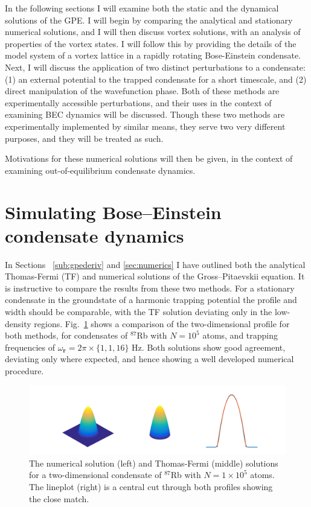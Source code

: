 In the following sections I will examine both the static and the dynamical solutions of the GPE. I will begin by comparing the analytical and stationary numerical solutions, and I will then discuss vortex solutions, with an analysis of properties of the vortex states. I will follow this by providing the details of the model system of a vortex lattice in a rapidly rotating Bose-Einstein condensate. Next, I will discuss the application of two distinct perturbations to a condensate: (1) an external potential to the trapped condensate for a short timescale, and (2) direct manipulation of the wavefunction phase. Both of these methods are experimentally accessible perturbations, and their uses in the context of examining BEC dynamics will be discussed. Though these two methods are experimentally implemented by similar means, they serve two very different purposes, and they will be treated as such.

Motivations for these numerical solutions will then be given, in the context of examining out-of-equilibrium condensate dynamics.


\section{Simulating Bose--Einstein condensate dynamics}

In Sections ~\ref{sub:gpederiv} and \ref{sec:numerics} I have outlined both the analytical Thomas-Fermi (TF) and numerical solutions of the Gross--Pitaevskii equation. It is instructive to compare the results from these two methods. For a stationary condensate in the groundstate of a harmonic trapping potential the profile and width should be comparable, with the TF solution deviating only in the low-density regions. Fig.~\ref{fig:gpe_tf_3} shows a comparison of the two-dimensional profile for both methods, for condensates of $^{87}$Rb with $N=10^{5}$ atoms, and trapping frequencies of $\omega_{\mathbf{r}}=2\pi\times\{1,1,16 \}$ Hz. Both solutions show good agreement, deviating only where expected, and hence showing a well developed numerical procedure.
\begin{figure}\centering
    \includegraphics[width=\textwidth,trim=0ex 0ex 0ex 0ex]{Images/ch4_vtx/gpe_tf_3.pdf}
    \caption{The numerical solution (left) and Thomas-Fermi (middle) solutions for a two-dimensional condensate of $^{87}$Rb with $N=1\times 10^5$ atoms. The lineplot (right) is a central cut through both profiles showing the close match.}\label{fig:gpe_tf_3}
\end{figure}

